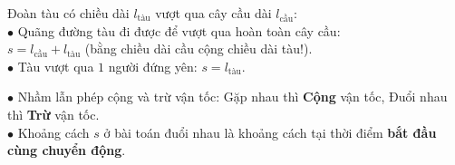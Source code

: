 \documentclass[14pt,a4paper,oneside]{extbook}
\begin{document}
\noindent
\begin{minipage}[t]{0.54\textwidth}
  \begin{tcolorbox}[
    enhanced,
    title={\footnotesize\bfseries\color{white}\faTrain\ Bài toán đoàn tàu vượt qua cây cầu},
    colback=green!3!white,
    colframe=green!60!black,
    arc=2.5mm, boxrule=0.8pt, top=1.8mm, bottom=1.8mm, left=2.2mm, right=2.2mm
  ]
    \footnotesize
    Đoàn tàu có chiều dài $l_{\text{tàu}}$ vượt qua cây cầu dài $l_{\text{cầu}}$:\\
    $\bullet$ Quãng đường tàu đi được để vượt qua hoàn toàn cây cầu:\\
    \quad $s = l_{\text{cầu}} + l_{\text{tàu}}$ (bằng chiều dài cầu cộng chiều dài tàu!).\\
    $\bullet$ Tàu vượt qua $1$ người đứng yên: $s = l_{\text{tàu}}$.
  \end{tcolorbox}
\end{minipage}%
\hfill
\begin{minipage}[t]{0.44\textwidth}
  \begin{tcolorbox}[
    enhanced,
    title={\footnotesize\bfseries\color{white}\faExclamationTriangle\ Mẹo tránh bẫy trắc nghiệm},
    colback=red!2!white,
    colframe=red!70!black,
    arc=2.5mm, boxrule=0.8pt, top=1.8mm, bottom=1.8mm, left=2.2mm, right=2.2mm
  ]
    \footnotesize
    $\bullet$ Nhầm lẫn phép cộng và trừ vận tốc: Gặp nhau thì \textbf{Cộng} vận tốc, Đuổi nhau thì \textbf{Trừ} vận tốc.\\
    $\bullet$ Khoảng cách $s$ ở bài toán đuổi nhau là khoảng cách tại thời điểm \textbf{bắt đầu cùng chuyển động}.
  \end{tcolorbox}
\end{minipage}
\end{document}

